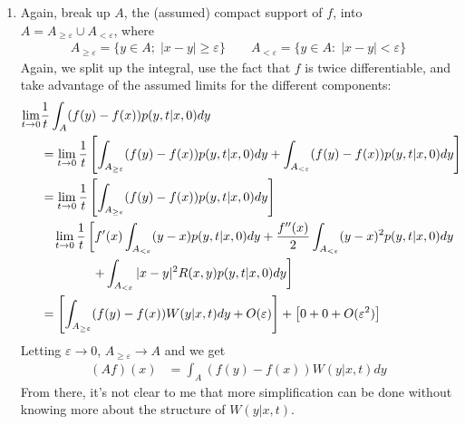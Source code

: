 \documentclass[12pt]{article}
\theoremstyle{plain}
\theoremstyle{definition}
\theoremstyle{remark}
\begin{document}
\begin{enumerate}
  \item %
    Again, break up $A$, the (assumed) compact support of $f$, into $A =
    A_{\geq\varepsilon} \cup A_{<\varepsilon}$, where
    \begin{align*}
      A_{\geq\varepsilon} = \{y \in A;\; |x-y| \geq \varepsilon\}
      \qquad
      A_{<\varepsilon} = \{y \in A:\; |x-y| < \varepsilon\}
    \end{align*}
    Again, we split up the integral, use the fact that $f$
    is twice differentiable, and take advantage of the assumed
    limits for the different components:
    \begin{align*}
      \lim_{t\rightarrow0} &\frac{1}{t}
      \int_A (f(y)-f(x))p(y,t|x,0) dy \\
      &= \lim_{t\rightarrow0} \frac{1}{t}
        \left[
        \int_{A_{\geq\varepsilon}} (f(y)-f(x))p(y,t|x,0) dy
        + \int_{A_{<\varepsilon}} (f(y)-f(x))p(y,t|x,0) dy
      \right]\notag\\
      &= \lim_{t\rightarrow0} \frac{1}{t}
        \left[
        \int_{A_{\geq\varepsilon}} (f(y)-f(x))p(y,t|x,0) dy \right]  \notag\\
      &\quad \lim_{t\rightarrow0} \frac{1}{t}
        \left[
         f'(x)\int_{A_{<\varepsilon}}
         (y-x) p(y,t|x,0) dy
        + \frac{f''(x)}{2} \int_{A_{<\varepsilon}}
          (y-x)^2 p(y,t|x,0) dy \right. \\
        & \qquad \qquad \left. +\int_{A_{<\varepsilon}}
          |x-y|^2R(x,y) p(y,t|x,0) dy
        \right]\\
      &=
        \left[
        \int_{A_{\geq\varepsilon}}
        (f(y)-f(x))W(y|x,t)dy  + O(\varepsilon)
        \right]
      + \left[ 0 + 0 + O(\varepsilon^2) \right]
    \end{align*}
    Letting $\varepsilon\to0$, $A_{\geq\varepsilon}\to A$ and we get
    \begin{align*}
      (Af)(x)
      &=
        \int_{A}
        (f(y)-f(x))W(y|x,t)dy
    \end{align*}
    From there, it's not clear to me that more simplification can be
    done without knowing more about the structure of $W(y|x,t)$.

\end{enumerate}



\end{document}
